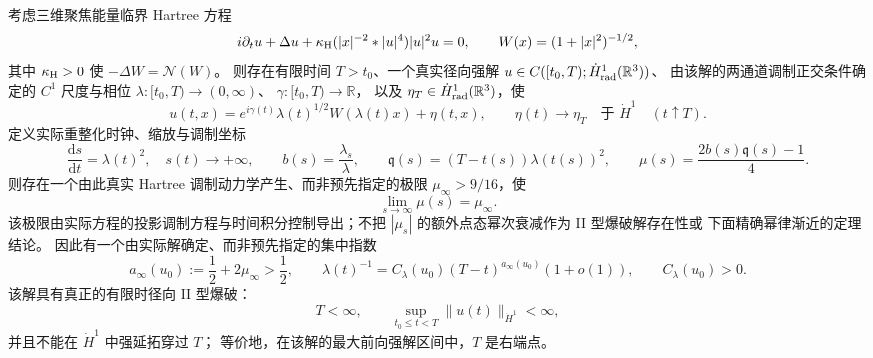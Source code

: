 
\begin{targettheorem}
\label{thm:main}
考虑三维聚焦能量临界 Hartree 方程
\[
 i\partial_tu+\Delta u+
 \kappa_{\rm H}(|x|^{-2}*|u|^4)|u|^2u=0,
 \qquad
 W(x)=(1+|x|^2)^{-1/2},
\]
其中 $\kappa_{\rm H}>0$ 使 $-\Delta W=\mathcal N(W)$。
则存在有限时间 $T>t_0$、一个真实径向强解
$u\in C([t_0,T);\dot H^1_{\rm rad}(\mathbb R^3))$、
由该解的两通道调制正交条件确定的 $C^1$ 尺度与相位
$\lambda:[t_0,T)\to(0,\infty)$、
$\gamma:[t_0,T)\to\mathbb R$，
以及 $\eta_T\in\dot H^1_{\rm rad}(\mathbb R^3)$，使
\[
 u(t,x)=e^{i\gamma(t)}\lambda(t)^{1/2}W(\lambda(t)x)
   +\eta(t,x),
 \qquad
 \eta(t)\longrightarrow\eta_T
 \quad\text{于 }\dot H^1\quad (t\uparrow T).
\]
定义实际重整化时钟、缩放与调制坐标
\[
 \frac{\mathrm ds}{\mathrm dt}=\lambda(t)^2,
 \quad s(t)\longrightarrow+\infty,\qquad
 b(s)=\frac{\lambda_s}{\lambda},\qquad
 \mathfrak q(s)=(T-t(s))\lambda(t(s))^2,
 \qquad
 \mu(s)=\frac{2b(s)\mathfrak q(s)-1}{4}.
\]
则存在一个由此真实 Hartree 调制动力学产生、而非预先指定的极限
$\mu_\infty>9/16$，使
\[
 \lim_{s\to\infty}\mu(s)=\mu_\infty.
\]
该极限由实际方程的投影调制方程与时间积分控制导出；不把
$|\mu_s|$ 的额外点态幂次衰减作为 II 型爆破解存在性或
下面精确幂律渐近的定理结论。
因此有一个由实际解确定、而非预先指定的集中指数
\[
 a_\infty(u_0):=\frac12+2\mu_\infty>\frac12,
 \qquad
 \lambda(t)^{-1}
 =C_\lambda(u_0)(T-t)^{a_\infty(u_0)}(1+o(1)),
 \qquad C_\lambda(u_0)>0.
\]
该解具有真正的有限时径向 II 型爆破：
\[
 T<\infty,\qquad
 \sup_{t_0\le t<T}\|u(t)\|_{\dot H^1}<\infty,
\]
并且不能在 $\dot H^1$ 中强延拓穿过 $T$；
等价地，在该解的最大前向强解区间中，$T$ 是右端点。
\end{targettheorem}



